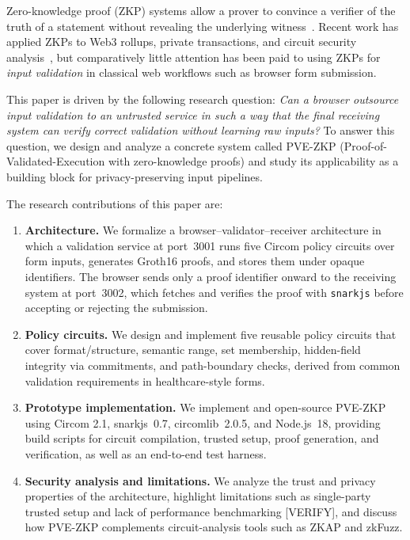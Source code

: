 \documentclass[conference]{IEEEtran}
\begin{document}
Zero-knowledge proof (ZKP) systems allow a prover to convince a verifier of the
truth of a statement without revealing the underlying witness~\cite{gmr85}.
Recent work has applied ZKPs to Web3 rollups, private transactions, and circuit
security analysis~\cite{chaliasos2024sok,zkap,zkfuzz}, but comparatively little
attention has been paid to using ZKPs for \emph{input validation} in classical
web workflows such as browser form submission.

This paper is driven by the following research question: \emph{Can a browser
outsource input validation to an untrusted service in such a way that the final
receiving system can verify correct validation without learning raw inputs?} To
answer this question, we design and analyze a concrete system called PVE-ZKP
(Proof-of-Validated-Execution with zero-knowledge proofs) and study its
applicability as a building block for privacy-preserving input pipelines.

The research contributions of this paper are:
\begin{enumerate}[leftmargin=*]
  \item \textbf{Architecture.} We formalize a browser--validator--receiver
    architecture in which a validation service at port~3001 runs five Circom
    policy circuits over form inputs, generates Groth16 proofs, and stores them
    under opaque identifiers. The browser sends only a proof identifier onward
    to the receiving system at port~3002, which fetches and verifies the proof
    with \texttt{snarkjs} before accepting or rejecting the submission.
  \item \textbf{Policy circuits.} We design and implement five reusable policy
    circuits that cover format/structure, semantic range, set membership,
    hidden-field integrity via commitments, and path-boundary checks, derived
    from common validation requirements in healthcare-style forms.
  \item \textbf{Prototype implementation.} We implement and open-source PVE-ZKP using Circom
    2.1, snarkjs~0.7, circomlib~2.0.5, and Node.js~18, providing build scripts
    for circuit compilation, trusted setup, proof generation, and verification,
    as well as an end-to-end test harness.
  \item \textbf{Security analysis and limitations.} We analyze the trust and
    privacy properties of the architecture, highlight limitations such as
    single-party trusted setup and lack of performance benchmarking
    [VERIFY], and discuss how PVE-ZKP complements circuit-analysis tools such as
    ZKAP and zkFuzz.
\end{enumerate}
\end{document}
